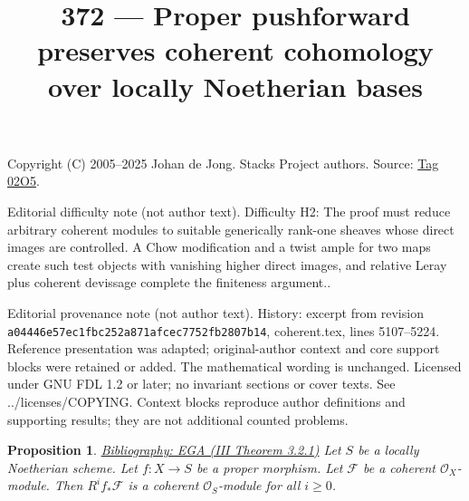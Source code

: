 \documentclass{amsart}
\newenvironment{reference}{\comment}{\endcomment}
\theoremstyle{plain}
\newtheorem{proposition}[subsection]{Proposition}
\theoremstyle{definition}
\theoremstyle{remark}
\numberwithin{equation}{subsection}
\begin{document}
\title[Stacks Project, Tag 02O5]{372 --- Proper pushforward preserves coherent cohomology over locally Noetherian bases}
\maketitle
\noindent Copyright (C) 2005--2025 Johan de Jong. Stacks Project authors. Source: \href{https://stacks.math.columbia.edu/tag/02O5}{Tag 02O5}.

\noindent Editorial difficulty note (not author text). Difficulty H2: The proof must reduce arbitrary coherent modules to suitable generically rank-one sheaves whose direct images are controlled. A Chow modification and a twist ample for two maps create such test objects with vanishing higher direct images, and relative Leray plus coherent devissage complete the finiteness argument..

\noindent Editorial provenance note (not author text). History: excerpt from revision \texttt{a0444\allowbreak 6e57e\allowbreak c1fbc\allowbreak 252a8\allowbreak 71afc\allowbreak ec775\allowbreak 2fb28\allowbreak 07b14}, coherent.tex, lines 5107--5224. Reference presentation was adapted; original-author context and core support blocks were retained or added. The mathematical wording is unchanged. Licensed under GNU FDL 1.2 or later; no invariant sections or cover texts. See ../licenses/COPYING. Context blocks reproduce author definitions and supporting results; they are not additional counted problems.

\begin{proposition}
\label{proposition-proper-pushforward-coherent}
\begin{reference}
\href{https://stacks.math.columbia.edu/bibliography}{Bibliography: EGA (III Theorem 3.2.1)}
\end{reference}
Let $S$ be a locally Noetherian scheme.
Let $f : X \to S$ be a proper morphism.
Let $\mathcal{F}$ be a coherent $\mathcal{O}_X$-module.
Then $R^if_*\mathcal{F}$ is a coherent $\mathcal{O}_S$-module
for all $i \geq 0$.
\end{proposition}
\end{document}
